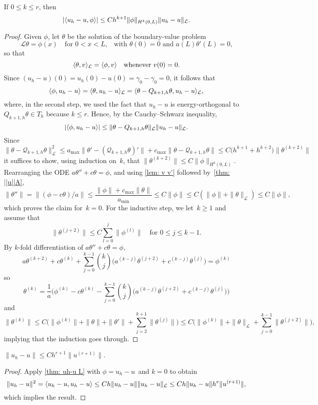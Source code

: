 \begin{theorem}
If $0\le k\le r$, then
\[
|\langle u_h-u,\phi\rangle|\le Ch^{k+1}\|\phi\|_{H^k(0,L)}\|u_h-u\|_{\mathcal{L}}.
\]
\end{theorem}
\begin{proof}
Given $\phi$, let $\theta$ be the solution of the boundary-value problem
\[
\mathcal{L}\theta=\phi(x)\quad\text{for $0<x<L$,}
	\quad\text{with $\theta(0)=0$ and $a(L)\theta'(L)=0$,}
\]
so that
\[
\langle\theta,v\rangle_{\mathcal{L}}=\langle\phi,v\rangle\quad\text{whenever $v(0)=0$.}
\]
Since $(u_h-u)(0)=u_h(0)-u(0)=\gamma_0-\gamma_0=0$, it follows that
\[
\langle\phi,u_h-u\rangle=\langle\theta,u_h-u\rangle_{\mathcal{L}}
	=\langle\theta-Q_{k+1,h}\theta,u_h-u\rangle_{\mathcal{L}},
\]
where, in the second step, we used the fact that $u_h-u$ is energy-orthogonal
to $Q_{k+1,h}\theta\in T_h$ because $k\le r$.  Hence, by the Cauchy--Schwarz 
inequality,
\[
|\langle\phi,u_h-u\rangle|\le\|\theta-Q_{k+1,h}\theta\|_{\mathcal{L}}
	\|u_h-u\|_{\mathcal{L}}.
\]
Since
\[
\|\theta-\mathcal{Q}_{k+1,h}\theta\|_{\mathcal{L}}^2
	\le a_{\max}\|\theta'-(\mathcal{Q}_{k+1,h}\theta)'\|
	+c_{\max}\|\theta-\mathcal{Q}_{k+1,h}\theta\|
	\le C\bigl(h^{k+1}+h^{k+2})\|\theta^{(k+2)}\|
\]
it suffices to show, using induction on~$k$, that 
$\|\theta^{(k+2)}\|\le C\|\phi\|_{H^k(0,L)}$.  
Rearranging the ODE $a\theta''+c\theta=\phi$,  and using \cref{lem: v v'} 
followed by~\cref{thm: ||u||A},
\[
\|\theta''\|=\|(\phi-c\theta)/a\|
	\le\frac{\|\phi\|+c_{\max}\|\theta\|}{a_{\min}}\le C\|\phi\|
	\le C(\|\phi\|+\|\theta\|_{\mathcal{L}})\le C\|\phi\|,
\]
which proves the claim for~$k=0$.  For the inductive step, we let~$k\ge1$ and
assume that 
\[
\|\theta^{(j+2)}\|\le C\sum_{l=0}^j\|\phi^{(l)}\|
	\quad\text{for~$0\le j\le k-1$.}
\]
By $k$-fold differentiation of $a\theta''+c\theta=\phi$, 
\[
a\theta^{(k+2)}+c\theta^{(k)}+\sum_{j=0}^{k-1}\binom{k}{j}\bigl(
	a^{(k-j)}\theta^{(j+2)}+c^{(k-j)}\theta^{(j)}\bigr)=\phi^{(k)}
\]
so
\[
\theta^{(k)}=\frac{1}{a}\bigg(\phi^{(k)}-c\theta^{(k)}
	-\sum_{j=0}^{k-1}\binom{k}{j}\bigl(
	a^{(k-j)}\theta^{(j+2)}+c^{(k-j)}\theta^{(j)}\bigr)\biggr)
\]
and
\[
\|\theta^{(k)}\|\le C\biggl(\|\phi^{(k)}\|+\|\theta\|+\|\theta'\|
	+\sum_{j=2}^{k+1}\|\theta^{(j)}\|\biggr)
\le C\biggl(\|\phi^{(k)}\|+\|\theta\|_{\mathcal{L}}
	+\sum_{j=0}^{k-1}\|\theta^{(j+2)}\|\biggr),
\]
implying that the induction goes through.
\end{proof}

\begin{corollary}
$\|u_h-u\|\le Ch^{r+1}\|u^{(r+1)}\|$.
\end{corollary}
\begin{proof}
Apply \cref{thm: uh-u L} with $\phi=u_h-u$~and $k=0$ to obtain
\[
\|u_h-u\|^2=\langle u_h-u,u_h-u\rangle\le Ch\|u_h-u\|\|u_h-u\|_{\mathcal{L}}
	\le Ch\|u_h-u\|h^r\|u^{(r+1)}\|,
\]
which implies the result.
\end{proof}

